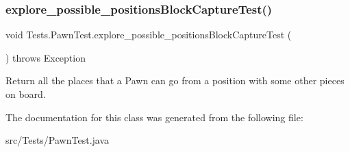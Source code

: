 \subsubsection{\texorpdfstring{explore\+\_\+possible\+\_\+positions\+Block\+Capture\+Test()}{explore\_possible\_positionsBlockCaptureTest()}}
{\footnotesize\ttfamily void Tests.\+Pawn\+Test.\+explore\+\_\+possible\+\_\+positions\+Block\+Capture\+Test (\begin{DoxyParamCaption}{ }\end{DoxyParamCaption}) throws Exception\hspace{0.3cm}{\ttfamily [inline]}}

Return all the places that a Pawn can go from a position with some other pieces on board. 

The documentation for this class was generated from the following file\+:\begin{DoxyCompactItemize}
\item 
src/\+Tests/Pawn\+Test.\+java\end{DoxyCompactItemize}
